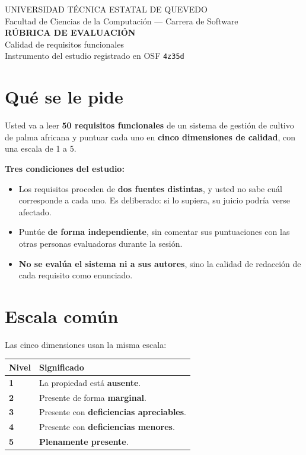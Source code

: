 \documentclass[11pt,a4paper]{article}
\begin{document}
\begin{center}
{\footnotesize UNIVERSIDAD TÉCNICA ESTATAL DE QUEVEDO\\
Facultad de Ciencias de la Computación --- Carrera de Software}\\[10pt]
{\Large\bfseries\color{uteqverde} RÚBRICA DE EVALUACIÓN}\\[3pt]
{\large Calidad de requisitos funcionales}\\[2pt]
{\footnotesize Instrumento del estudio registrado en OSF \texttt{4z35d}}
\end{center}

\vspace{6pt}

\section*{Qué se le pide}

Usted va a leer \textbf{50 requisitos funcionales} de un sistema de gestión de
cultivo de palma africana y puntuar cada uno en \textbf{cinco dimensiones de
calidad}, con una escala de 1 a 5.

\begin{tcolorbox}[colback=grisclaro,colframe=uteqverde,boxrule=0.6pt,arc=2pt]
\textbf{Tres condiciones del estudio:}
\begin{itemize}[nosep,leftmargin=1.4em]
  \item Los requisitos proceden de \textbf{dos fuentes distintas}, y usted no
        sabe cuál corresponde a cada uno. Es deliberado: si lo supiera, su
        juicio podría verse afectado.
  \item Puntúe \textbf{de forma independiente}, sin comentar sus puntuaciones
        con las otras personas evaluadoras durante la sesión.
  \item \textbf{No se evalúa el sistema ni a sus autores}, sino la calidad de
        redacción de cada requisito como enunciado.
\end{itemize}
\end{tcolorbox}

\section{Escala común}

Las cinco dimensiones usan la misma escala:

\renewcommand{\arraystretch}{1.3}
\begin{longtable}{C{1.2cm} L{13.5cm}}
\toprule
{}
\textbf{Nivel} & \textbf{Significado} \\
\midrule
\endhead
\textbf{1} & La propiedad está \textbf{ausente}. \\
\textbf{2} & Presente de forma \textbf{marginal}. \\
\textbf{3} & Presente con \textbf{deficiencias apreciables}. \\
\textbf{4} & Presente con \textbf{deficiencias menores}. \\
\textbf{5} & \textbf{Plenamente presente}. \\
\bottomrule
\end{longtable}
\end{document}
